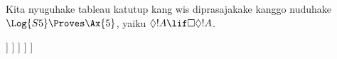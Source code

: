\documentclass[../../../include/open-logic-section]{subfiles}
\begin{document}
\begin{ex}
  Kita nyuguhake tableau katutup kang wis diprasajakake kanggo nuduhake
  $\Log{S5} \Proves \Ax{5}$, yaiku $\Diamond!A \lif \Box\Diamond!A$.
  \begin{oltableau}
    [\pFmla{\False}{\Diamond\formula{A} \lif \Box\Diamond \formula{A}}{1},
      just = \TAss
      [\pFmla{\True}{\Diamond \formula{A}}{1}, just = {\TRule{\False}{\lif}[1]}
        [\pFmla{\False}{\Box\Diamond \formula{A}}{1},
          just = {\TRule{\False}{\lif}[1]}
          [\pFmla{\False}{\Diamond \formula{A}}{2},
            just = {\TRule{\False}{\Box}[3]}
            [\pFmla{\True}{\formula{A}}{3},
              just = {\TRule{\True}{\Diamond}[2]}
                [\pFmla{\False}{\formula{A}}{3},
                  just = {\TRule{\False}{\Diamond}[4]}, close]
            ]
          ]
        ]
      ]
    ]
  \end{oltableau}
\end{ex}
\end{document}
